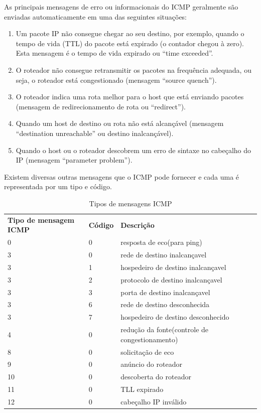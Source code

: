 \documentclass[
	article,			%
	11pt,				%
	oneside,			%
	a4paper,			%
	section=TITLE,		%
	english,			%
	brazil,				%
	sumario=tradicional
	]{abntex2}
\begin{document}
 As principais mensagens de erro ou informacionais do ICMP geralmente são enviadas automaticamente em uma das seguintes situações:
 \begin{enumerate}
 	\item Um pacote IP não consegue chegar ao seu destino, por exemplo, quando o tempo de vida (TTL) do pacote está expirado (o contador chegou à zero). Esta mensagem é o tempo de vida expirado ou “time exceeded”.
 	
 	\item O roteador não consegue retransmitir os pacotes na frequência adequada, ou seja, o roteador está congestionado (mensagem “source quench”).
 	
 	\item O roteador indica uma rota melhor para o host que está enviando pacotes (mensagem de redirecionamento de rota ou “redirect”).
 	
 	\item Quando um host de destino ou rota não está alcançável (mensagem “destination unreachable” ou destino inalcançável).
 	
 	\item Quando o host ou o roteador descobrem um erro de sintaxe no cabeçalho do IP (mensagem “parameter problem”). 
 \end{enumerate}
	Existem diversas outras mensagens que o ICMP pode fornecer e cada uma é representada por um tipo e código.\cite{dltec}
 \begin{table}[H]
 	\centering
 	\caption{Tipos de mensagens ICMP}
 	\label{table-ICMP}
 	\begin{tabular}{lllll}
 		\cline{1-3}
\textbf{Tipo de mensagem ICMP} &	\textbf{Código}& \textbf{Descrição}\\ \cline{1-3}
 	    0 &   0&   resposta de eco(para ping)&    \\ \cline{1-3}
 		3 &   0&  rede de destino inalcançavel&    \\ \cline{1-3}
 		3 &   1&  hospedeiro de destino inalcançavel&    \\ \cline{1-3}
 		3 &   2&  protocolo de destino inalcançavel&   \\ \cline{1-3}
 		3 &   3&  porta de destino inalcançavel&    \\ \cline{1-3}
 		3 &   6&  rede de destino desconhecida&    \\ \cline{1-3}
 		3 &   7&  hospedeiro de destino desconhecido&     \\ \cline{1-3}
 		4 &   0&  redução da fonte(controle de congestionamento)&    \\ \cline{1-3}
 		8 &   0&  solicitação de eco&    \\ \cline{1-3}
 		9 &   0&  anúncio do roteador&    \\ \cline{1-3}
 		10 &  0&  descoberta do roteador&    \\ \cline{1-3}
 		11 &  0&  TLL expirado&    \\ \cline{1-3}
 		12 &  0&  cabeçalho IP inválido&    \\ \cline{1-3}
 	\end{tabular}
 \end{table}
\end{document}
